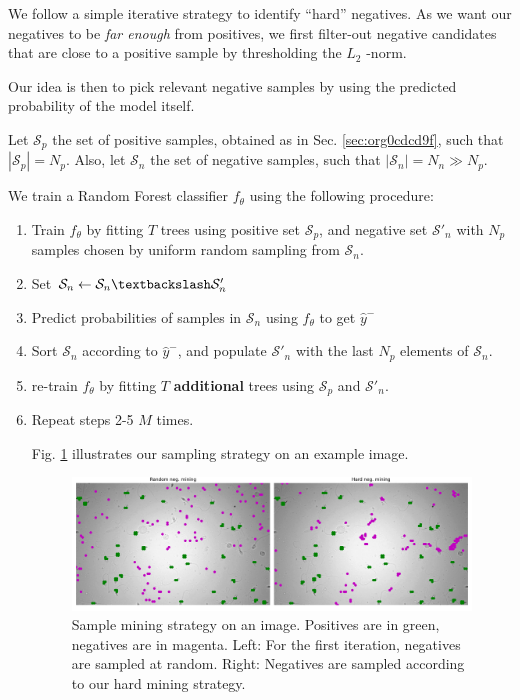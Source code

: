\documentclass[11pt]{article}
\begin{document}
We follow a simple iterative strategy to identify ``hard'' negatives.
As we want our negatives to be \emph{far enough} from positives, we first filter-out negative candidates that are
close to a positive sample by thresholding the \(L_2\) -norm.

Our idea is then to pick relevant negative samples by using the predicted probability of the model itself.

Let \(\mathcal{S}_p\) the set of positive samples, obtained as in Sec. \ref{sec:org0cdcd9f}, such that \(|\mathcal{S}_p|=N_p\).
Also, let \(\mathcal{S}_n\) the set of negative samples, such that \(|\mathcal{S}_n|=N_n \gg N_p\).


We train a Random Forest classifier \(f_\theta\) using the following procedure:

\begin{enumerate}
\item Train \(f_\theta\) by fitting \(T\) trees using positive set \(\mathcal{S}_p\), and negative set \(\mathcal{S}'_n\) with \(N_p\)
samples chosen by uniform random sampling from \(\mathcal{S}_n\).
\item Set \(\mathcal{S}_n \leftarrow \mathcal{S}_n \textbackslash \mathcal{S}'_n\)
\item Predict probabilities of samples in \(\mathcal{S}_n\) using \(f_\theta\) to get \(\hat{y}^-\)
\item Sort \(\mathcal{S}_n\) according to \(\hat{y}^-\), and populate
\(\mathcal{S}'_n\) with the last \(N_p\) elements of \(\mathcal{S}_n\).
\item re-train \(f_\theta\) by fitting \(T\) \textbf{additional} trees using \(\mathcal{S}_p\) and \(\mathcal{S}'_n\).
\item Repeat steps 2-5 \(M\) times.

Fig. \ref{fig:org739cfaf} illustrates our sampling strategy on an example image.

\begin{figure}[htbp]
\centering
\includegraphics[width=.9\linewidth]{./mining_prev.png}
\caption{\label{fig:org739cfaf}Sample mining strategy on an image. Positives are in green, negatives are in magenta. Left: For the first iteration, negatives are sampled at random. Right: Negatives are sampled according to our hard mining strategy.}
\end{figure}
\end{enumerate}
\end{document}

